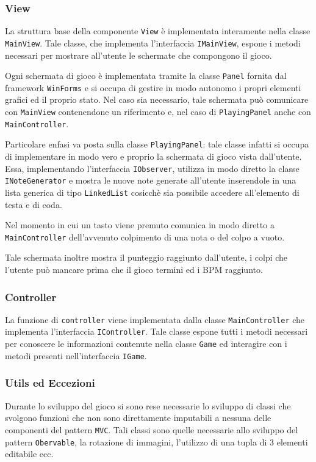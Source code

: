 \subsubsection{View}
La struttura base della componente \texttt{View} è implementata interamente nella classe \texttt{MainView}. Tale classe, che implementa l'interfaccia \texttt{IMainView}, espone i metodi necessari per mostrare all'utente le schermate che compongono il gioco.

Ogni schermata di gioco è implementata tramite la classe \texttt{Panel} fornita dal framework \texttt{WinForms} e si occupa di gestire in modo autonomo i propri elementi grafici ed il proprio stato.
Nel caso sia necessario, tale schermata può comunicare con \texttt{MainView} contenendone un riferimento e, nel caso di \texttt{PlayingPanel} anche con \texttt{MainController}.

\vspace{0.5cm}
Particolare enfasi va posta sulla classe \texttt{PlayingPanel}: tale classe infatti si occupa di implementare in modo vero e proprio la schermata di gioco vista dall'utente.
Essa, implementando l'interfaccia \texttt{IObserver}, utilizza in modo diretto la classe \texttt{INoteGenerator} e mostra le nuove note generate all'utente inserendole in una lista generica di tipo \texttt{LinkedList} cosicchè sia possibile accedere all'elemento di testa e di coda.

Nel momento in cui un tasto viene premuto comunica in modo diretto a \texttt{MainController} dell'avvenuto colpimento di una nota o del colpo a vuoto.

Tale schermata inoltre mostra il punteggio raggiunto dall'utente, i colpi che l'utente può mancare prima che il gioco termini ed i BPM raggiunto.

\subsubsection{Controller}
La funzione di \texttt{controller} viene implementata dalla classe \texttt{MainController} che implementa l'interfaccia \texttt{IController}.
Tale classe espone tutti i metodi necessari per conoscere le informazioni contenute nella classe \texttt{Game} ed interagire con i metodi presenti nell'interfaccia \texttt{IGame}.

\newpage
\subsubsection{Utils ed Eccezioni}
Durante lo sviluppo del gioco si sono rese necessarie lo sviluppo di classi che svolgono funzioni che non sono direttamente imputabili a nessuna delle componenti del pattern \texttt{MVC}.
Tali classi sono quelle necessarie allo sviluppo del pattern \texttt{Obervable}, la rotazione di immagini, l'utilizzo di una tupla di 3 elementi editabile ecc.

